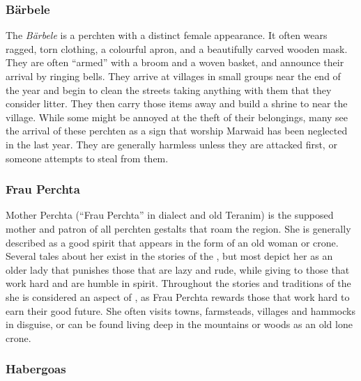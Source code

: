 \subsubsection{Bärbele}
\label{sec:Barbele}

The \emph{Bärbele} is a perchten with a distinct female appearance. It often
wears ragged, torn clothing, a colourful apron, and a beautifully carved
wooden mask. They are often ``armed'' with a broom and a woven basket, and
announce their arrival by ringing bells. They arrive at villages in small
groups near the end of the year and begin to clean the streets taking anything
with them that they consider litter. They then carry those items away and
build a shrine to  near the village. While some might be
annoyed at the theft of their belongings, many see the arrival of these
perchten as a sign that worship Marwaid has been neglected in the last
year. They are generally harmless unless they are attacked first, or someone
attempts to steal from them.

\subsubsection{Frau Perchta}
\label{sec:Frau Perchta}

Mother Perchta (``Frau Perchta'' in dialect and old Teranim) is the supposed
mother and patron of all perchten gestalts that roam the region. She is
generally described as a good spirit that appears in the form of an old woman
or crone. Several tales about her exist in the stories of the , but most depict her as an older lady that punishes those that are
lazy and rude, while giving to those that work hard and are humble in spirit.
Throughout the stories and traditions of the  she is
considered an aspect of , as Frau Perchta rewards those
that work hard to earn their good future. She often visits towns, farmsteads,
villages and hammocks in disguise, or can be found living deep in the mountains
or woods as an old lone crone.

\subsubsection{Habergoas}
\label{sec:Habergoas}


